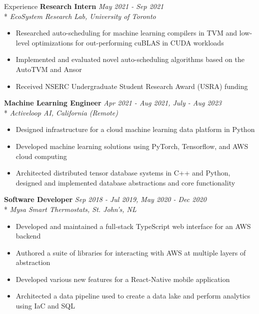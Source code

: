 \documentclass[11pt, letterpaper]{article}
\begin{document}
\begin{section}{Experience}
\textbf{Research Intern}
\hfill
\textit{May 2021 - Sep 2021}\\*
\textit{EcoSystem Research Lab, University of Toronto}
\begin{itemize}
  \item Researched auto-scheduling for machine learning compilers in TVM and low-level optimizations for out-performing cuBLAS in CUDA workloads
  \item Implemented and evaluated novel auto-scheduling algorithms based on the AutoTVM and Ansor
  \item Received NSERC Undergraduate Student Research Award (USRA) funding \\
\end{itemize}

\textbf{Machine Learning Engineer}
\hfill
\textit{Apr 2021 - Aug 2021, July - Aug 2023}\\*
\textit{Activeloop AI, California (Remote)}
\begin{itemize}
  \item Designed infrastructure for a cloud machine learning data platform in Python
  \item Developed machine learning solutions using PyTorch, Tensorflow, and AWS cloud computing
  \item Architected distributed tensor database systems in C++ and Python, designed and implemented database abstractions and core functionality \\
\end{itemize}

\textbf{Software Developer}
\hfill
\textit{Sep 2018 - Jul 2019, May 2020 - Dec 2020}\\*
\textit{Mysa Smart Thermostats, St. John's, NL}
\begin{itemize}
  \item Developed and maintained a full-stack TypeScript web interface for an AWS backend
  \item Authored a suite of libraries for interacting with AWS at multiple layers of abstraction
  \item Developed various new features for a React-Native mobile application
  \item Architected a data pipeline used to create a data lake and perform analytics using IaC and SQL \\
\end{itemize}


\end{section}
\end{document}
